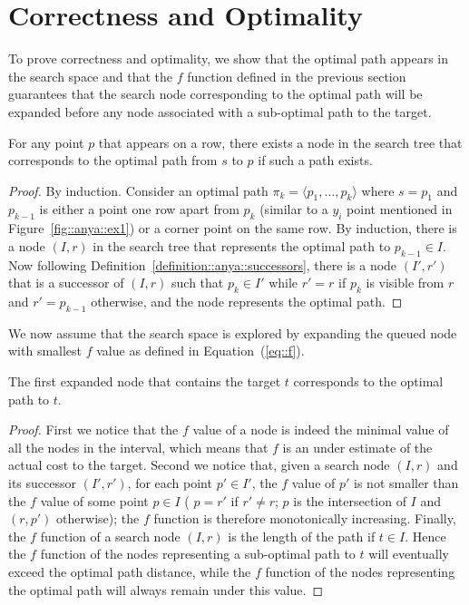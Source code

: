 \section{Correctness and Optimality}

To prove correctness and optimality, 
we show that the optimal path 
appears in the search space 
and that the $f$ function defined in the previous section 
guarantees that the search node 
corresponding to the optimal path 
will be expanded before any node 
associated with a sub-optimal path to the target.  

\begin{theorem}
  For any point $p$ that appears on a row, 
  there exists a node in the search tree 
  that corresponds to the optimal path from $s$ to $p$ 
  if such a path exists.  
\end{theorem}

\begin{proof}
  By induction.  
  Consider an optimal path 
  $\pi_k = \langle p_1,\dots,p_k\rangle$ 
  where $s = p_1$ and $p_{k-1}$ is either a point 
  one row apart from $p_k$ (similar to a $y_i$ point
  mentioned in Figure~\ref{fig::anya::ex1}) or a corner point on the same row.  
  By induction, there is a node $(I,r)$ in the search tree 
  that represents the optimal path to $p_{k-1} \in I$.  
  Now following Definition~\ref{definition::anya::successors}, 
  there is a node $(I',r')$ 
  that is a successor of $(I,r)$ 
  such that $p_k \in I'$ while $r' = r$ if $p_k$ is visible from $r$ 
  and $r' = p_{k-1}$ otherwise, and the node represents the optimal path.  
\end{proof}

We now assume that the search space is explored 
by expanding the queued node with smallest $f$ value 
as defined in Equation~(\ref{eq::f}).  

\begin{theorem}
  The first expanded node 
  that contains the target $t$ 
  corresponds to the optimal path to $t$.  
\end{theorem}

\begin{proof}
  First we notice that the $f$ value of a node 
  is indeed the minimal value of all the nodes in the interval, 
  which means that $f$ is an under estimate of the actual cost 
  to the target.  
  Second we notice that, given a search node $(I,r)$ 
  and its successor $(I',r')$, 
  for each point $p' \in I'$, 
  the $f$ value of $p'$ is not smaller 
  than the $f$ value of some point $p \in I$ 
  (%
  $p = r'$ if $r' \neq r$; 
  $p$ is the intersection of $I$ and $(r,p')$ otherwise); 
  the $f$ function is therefore monotonically increasing.  
  Finally, the $f$ function of a search node $(I,r)$ 
  is the length of the path if $t \in I$.  
  Hence the $f$ function of the nodes representing 
  a sub-optimal path to $t$ 
  will eventually exceed the optimal path distance, 
  while the $f$ function of the nodes representing the optimal path 
  will always remain under this value.  
\end{proof}

